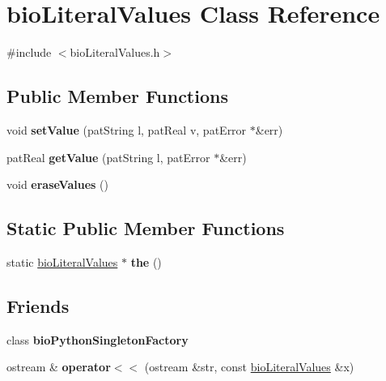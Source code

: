 \hypertarget{classbio_literal_values}{}\section{bio\+Literal\+Values Class Reference}
\label{classbio_literal_values}


{\ttfamily \#include $<$bio\+Literal\+Values.\+h$>$}

\subsection*{Public Member Functions}
\begin{DoxyCompactItemize}
\item 
\mbox{\label{classbio_literal_values_a3e3069da9665524ea9ea3171d7f668c3}} 
void {\bfseries set\+Value} (pat\+String l, pat\+Real v, pat\+Error $\ast$\&err)
\item 
\mbox{\label{classbio_literal_values_a62ee185917c49f7b8c890453139db14f}} 
pat\+Real {\bfseries get\+Value} (pat\+String l, pat\+Error $\ast$\&err)
\item 
\mbox{\label{classbio_literal_values_a4fd5483195edc711a9d98ceb751569d6}} 
void {\bfseries erase\+Values} ()
\end{DoxyCompactItemize}
\subsection*{Static Public Member Functions}
\begin{DoxyCompactItemize}
\item 
\mbox{\label{classbio_literal_values_a388466bc6786957a30b85c370fe27eef}} 
static \hyperlink{classbio_literal_values}{bio\+Literal\+Values} $\ast$ {\bfseries the} ()
\end{DoxyCompactItemize}
\subsection*{Friends}
\begin{DoxyCompactItemize}
\item 
\mbox{\label{classbio_literal_values_a7112c3c569ac638826c63fda15012746}} 
class {\bfseries bio\+Python\+Singleton\+Factory}
\item 
\mbox{\label{classbio_literal_values_a2f532a2b1e275eceaa9829cf79c403d4}} 
ostream \& {\bfseries operator$<$$<$} (ostream \&str, const \hyperlink{classbio_literal_values}{bio\+Literal\+Values} \&x)
\end{DoxyCompactItemize}


